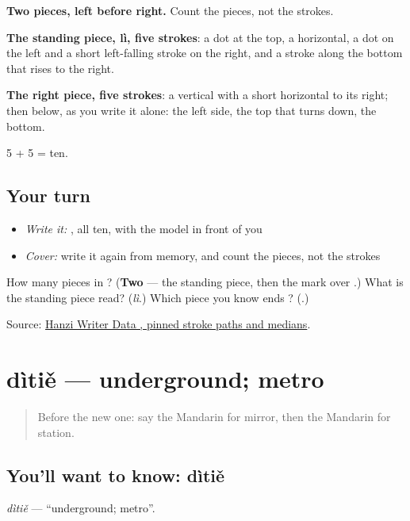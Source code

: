 \begin{quote}
\end{quote}

\textbf{Two pieces, left before right.} Count the pieces, not the strokes.

\textbf{The standing piece, lì, five strokes}: a dot at the top, a horizontal, a dot on the left and a short left-falling stroke on the right, and a stroke along the bottom that rises to the right.

\textbf{The right piece, five strokes}: a vertical with a short horizontal to its right; then  below, as you write it alone: the left side, the top that turns down, the bottom.

5 + 5 = ten.

\subsection*{Your turn}
\begin{itemize}
\raggedright
  \item \emph{Write it:} , all ten, with the model in front of you
  \item \emph{Cover:} write it again from memory, and count the pieces, not the strokes
\end{itemize}

\begin{tcolorbox}[breakable,colback=teal!4,colframe=teal!35!black,title={Before you move on}]
How many pieces in ? (\textbf{Two} — the standing piece, then the mark over .) What is the standing piece read? (\emph{lì}.) Which piece you know ends ? (\textbf{}.)

Source: \href{https://raw.githubusercontent.com/chanind/hanzi-writer-data/68d10a4b21150cae5e1ebbd223eed289cf32d90c/data/\%E7\%AB\%99.json}{Hanzi Writer Data , pinned stroke paths and medians}.
\end{tcolorbox}
\section[dìtiě]{dìtiě — underground; metro}

\label{lesson:ZH-C106-ditie}



\begin{quote}
Before the new one: say the Mandarin for mirror, then the Mandarin for station.
\end{quote}

\subsection*{You'll want to know: dìtiě}
\emph{dìtiě} — \textquotedblleft{}underground; metro\textquotedblright{}.


